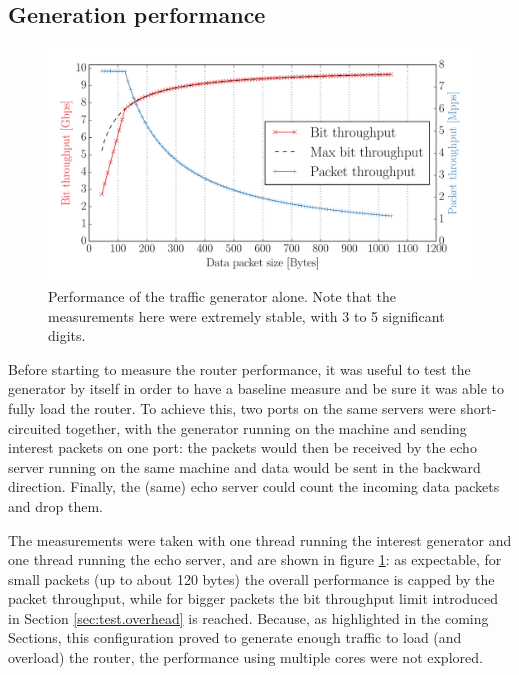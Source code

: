 \documentclass[11pt,a4paper,twoside,titlepage,openany]{book}
\begin{document}
\subsection{Generation performance}
\begin{figure}[tb]
  \begin{center}
    \includegraphics[width=1.0\textwidth]{img/traffgen_increasing_len.pdf}
    \caption[Performance of the traffic generator alone]{Performance of the traffic generator alone. Note that the measurements here were extremely stable, with 3 to 5 significant digits.}
    \label{fig:test.traffgen-perf}
  \end{center}
\end{figure}
Before starting to measure the router performance, it was useful to test the generator by itself in order to have a baseline measure and be sure it was able to fully load the router.
To achieve this, two ports on the same servers were short-circuited together, with the generator running on the machine and sending interest packets on one port: the packets would then be received by the echo server running on the same machine and data would be sent in the backward direction. Finally, the (same) echo server could count the incoming data packets and drop them.

The measurements were taken with one thread running the interest generator and one thread running the echo server, and are shown in figure \ref{fig:test.traffgen-perf}: as expectable, for small packets (up to about 120 bytes) the overall performance is capped by the packet throughput, while for bigger packets the bit throughput limit introduced in Section \ref{sec:test.overhead} is reached.
Because, as highlighted in the coming Sections, this configuration proved to generate enough traffic to load (and overload) the router, the performance using multiple cores were not explored.
\end{document}
